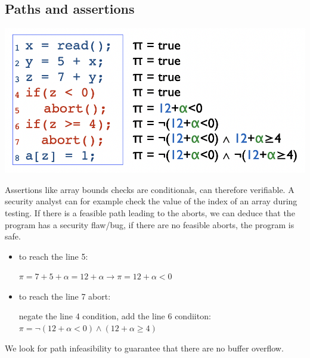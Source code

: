 \documentclass[11pt, oneside]{article}   	%
\begin{document}
\subsection*{Paths and assertions}
\begin{center}
\includegraphics[scale = 0.4]{dov6}
\end{center}
Assertions like array bounds checks are conditionals, can therefore verifiable. A security analyst can for example check the value of the index of an array during testing. If there is a feasible path leading to the aborts, we can deduce that the program has a security flaw/bug, if there are no feasible aborts, the program is safe.\begin{itemize}
\item to reach the line 5: \begin{center}
$\pi = 7+5+\alpha= 12+\alpha \rightarrow \pi = 12+ \alpha < 0$
\end{center}
\item to reach the line 7 abort: \begin{center}
negate the line 4 condition, add the line 6 condiiton:\\
$\pi = \lnot(12+\alpha < 0) \land(12+\alpha \geq 4)$
\end{center}
\end{itemize}
We look for path infeasibility to guarantee that there are no buffer overflow.
\end{document}
